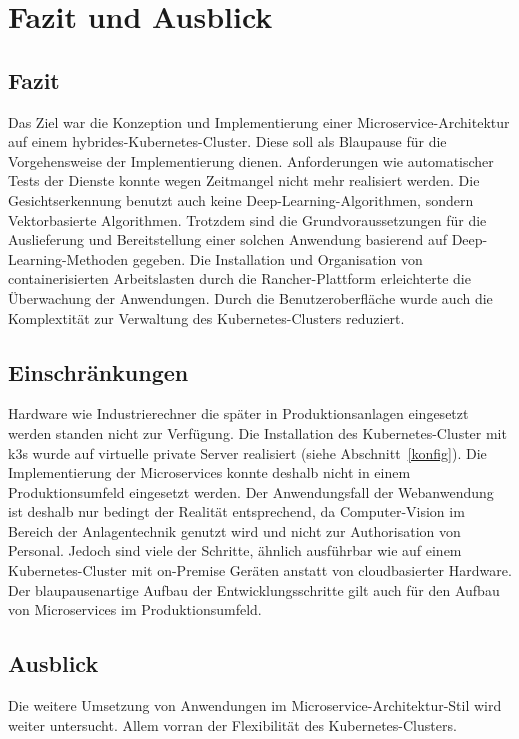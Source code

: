 \chapter{Fazit und Ausblick}
\section{Fazit}
Das Ziel war die Konzeption und Implementierung einer Microservice-Architektur auf einem hybrides-Kubernetes-Cluster.
Diese soll als Blaupause für die Vorgehensweise der Implementierung dienen.
Anforderungen wie automatischer Tests der Dienste konnte wegen Zeitmangel nicht mehr realisiert werden.
Die Gesichtserkennung benutzt auch keine Deep-Learning-Algorithmen, sondern Vektorbasierte Algorithmen.
Trotzdem sind die Grundvoraussetzungen für die Auslieferung und Bereitstellung einer solchen Anwendung basierend auf Deep-Learning-Methoden gegeben.
Die Installation und Organisation von containerisierten Arbeitslasten durch die Rancher-Plattform erleichterte die Überwachung der Anwendungen.
Durch die Benutzeroberfläche wurde auch die Komplextität zur Verwaltung des Kubernetes-Clusters reduziert.




\section{Einschränkungen}\label{Einschraenkungen}
Hardware wie Industrierechner die später in Produktionsanlagen eingesetzt werden standen nicht zur Verfügung.
Die Installation des Kubernetes-Cluster mit k3s wurde auf virtuelle private Server realisiert (siehe Abschnitt~\ref{konfig}).
Die Implementierung der Microservices konnte deshalb nicht in einem Produktionsumfeld eingesetzt werden.
Der Anwendungsfall der Webanwendung ist deshalb nur bedingt der Realität entsprechend, da Computer-Vision im Bereich der Anlagentechnik genutzt wird und nicht zur Authorisation von Personal.
Jedoch sind viele der Schritte, ähnlich ausführbar wie auf einem Kubernetes-Cluster mit on-Premise Geräten anstatt von cloudbasierter Hardware.
Der blaupausenartige Aufbau der Entwicklungsschritte gilt auch für den Aufbau von Microservices im Produktionsumfeld.

\section{Ausblick}
Die weitere Umsetzung von Anwendungen im Microservice-Architektur-Stil wird weiter untersucht.
Allem vorran der Flexibilität des Kubernetes-Clusters.
